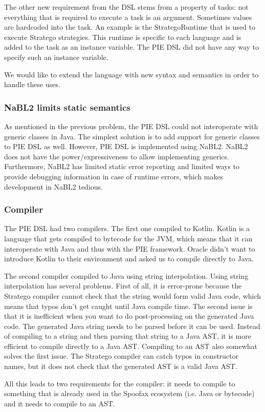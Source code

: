 The other new requirement from the DSL stems from a property of tasks: not everything that is required to execute a task is an argument.
Sometimes values are hardcoded into the task.
An example is the StrategoRuntime that is used to execute Stratego strategies.
This runtime is specific to each language and is added to the task as an instance variable.
The PIE DSL did not have any way to specify such an instance variable.

We would like to extend the language with new syntax and semantics in order to handle these uses.

\subsubsection{NaBL2 limits static semantics}
\label{subsubsec:problem_analysis__problems__nabl2}

As mentioned in the previous problem,  the PIE DSL could not interoperate with generic classes in Java.
The simplest solution is to add support for generic classes to PIE DSL as well.
However, PIE DSL is implemented using NaBL2.
NaBL2 does not have the power/expressiveness to allow implementing generics.
Furthermore, NaBL2 has limited static error reporting and limited ways to provide debugging information in case of runtime errors, which makes development in NaBL2 tedious.

\subsubsection{Compiler}
\label{subsubsec:problem_analysis__problems__compiler}

The PIE DSL had two compilers.
The first one compiled to Kotlin.
Kotlin is a language that gets compiled to bytecode for the JVM, which means that it can interoperate with Java and thus with the PIE framework.
Oracle didn't want to introduce Kotlin to their environment and asked us to compile directly to Java.

The second compiler compiled to Java using string interpolation.
Using string interpolation has several problems.
First of all, it is error-prone because the Stratego compiler cannot check that the string would form valid Java code, which means that typos don't get caught until Java compile time.
The second issue is that it is inefficient when you want to do post-processing on the generated Java code.
The generated Java string needs to be parsed before it can be used.
Instead of compiling to a string and then parsing that string to a Java AST, it is more efficient to compile directly to a Java AST.
Compiling to an AST also somewhat solves the first issue.
The Stratego compiler can catch typos in constructor names, but it does not check that the generated AST is a valid Java AST.

All this leads to two requirements for the compiler: it needs to compile to something that is already used in the Spoofax ecosystem (i.e. Java or bytecode) and it needs to compile to an AST.

